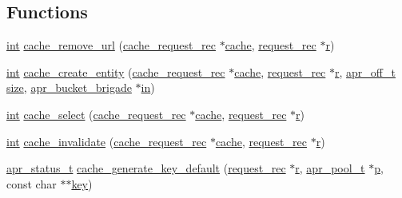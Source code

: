 \subsection*{Functions}
\begin{DoxyCompactItemize}
\item 
\hyperlink{pcre_8txt_a42dfa4ff673c82d8efe7144098fbc198}{int} \hyperlink{group__Cache__storage_ga099a01e4f8a6d68cc94a47adde527489}{cache\+\_\+remove\+\_\+url} (\hyperlink{structcache__request__rec}{cache\+\_\+request\+\_\+rec} $\ast$\hyperlink{structcache}{cache}, \hyperlink{structrequest__rec}{request\+\_\+rec} $\ast$\hyperlink{pcregrep_8txt_a2e9e9438b26c0bb4425367a7e4f75eb3}{r})
\item 
\hyperlink{pcre_8txt_a42dfa4ff673c82d8efe7144098fbc198}{int} \hyperlink{group__Cache__storage_gaa8317a8938235881e7f1368031b33bb9}{cache\+\_\+create\+\_\+entity} (\hyperlink{structcache__request__rec}{cache\+\_\+request\+\_\+rec} $\ast$\hyperlink{structcache}{cache}, \hyperlink{structrequest__rec}{request\+\_\+rec} $\ast$\hyperlink{pcregrep_8txt_a2e9e9438b26c0bb4425367a7e4f75eb3}{r}, \hyperlink{group__apr__platform_ga6938af9075cec15c88299109381aa984}{apr\+\_\+off\+\_\+t} \hyperlink{README_8txt_a870076999eb1486aa63d2e2cf5cdfa55}{size}, \hyperlink{structapr__bucket__brigade}{apr\+\_\+bucket\+\_\+brigade} $\ast$\hyperlink{group__apr__thread__proc_ga2e46fea00cc2238744ebca5061c62bcc}{in})
\item 
\hyperlink{pcre_8txt_a42dfa4ff673c82d8efe7144098fbc198}{int} \hyperlink{group__Cache__storage_gaffb29f2e1276bc7d81bac540a1cf3e06}{cache\+\_\+select} (\hyperlink{structcache__request__rec}{cache\+\_\+request\+\_\+rec} $\ast$\hyperlink{structcache}{cache}, \hyperlink{structrequest__rec}{request\+\_\+rec} $\ast$\hyperlink{pcregrep_8txt_a2e9e9438b26c0bb4425367a7e4f75eb3}{r})
\item 
\hyperlink{pcre_8txt_a42dfa4ff673c82d8efe7144098fbc198}{int} \hyperlink{group__Cache__storage_ga8579a258895a1e158ebe9e61deb15d9a}{cache\+\_\+invalidate} (\hyperlink{structcache__request__rec}{cache\+\_\+request\+\_\+rec} $\ast$\hyperlink{structcache}{cache}, \hyperlink{structrequest__rec}{request\+\_\+rec} $\ast$\hyperlink{pcregrep_8txt_a2e9e9438b26c0bb4425367a7e4f75eb3}{r})
\item 
\hyperlink{group__apr__errno_gaa5105fa83cc322f09382292db8b47593}{apr\+\_\+status\+\_\+t} \hyperlink{group__Cache__storage_ga9b9cd90883d10b4e8f021c0cc371a823}{cache\+\_\+generate\+\_\+key\+\_\+default} (\hyperlink{structrequest__rec}{request\+\_\+rec} $\ast$\hyperlink{pcregrep_8txt_a2e9e9438b26c0bb4425367a7e4f75eb3}{r}, \hyperlink{structapr__pool__t}{apr\+\_\+pool\+\_\+t} $\ast$\hyperlink{group__APACHE__CORE__MPM_ga5cd91701e5c167f2b1a38e70ab57817e}{p}, const char $\ast$$\ast$\hyperlink{apr__siphash_8h_adac0b6a30345ea1d0daa8a692b0b7ad9}{key})
$$
\end{DoxyCompactItemize}
